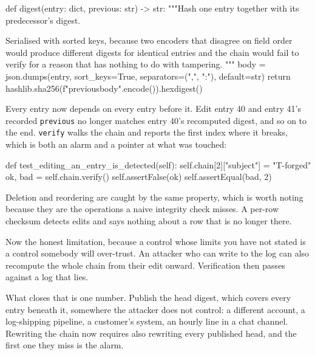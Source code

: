 \begin{py}
def digest(entry: dict, previous: str) -> str:
    """Hash one entry together with its predecessor's digest.

    Serialised with sorted keys, because two encoders that disagree on field
    order would produce different digests for identical entries and the chain
    would fail to verify for a reason that has nothing to do with tampering.
    """
    body = json.dumps(entry, sort_keys=True, separators=(",", ":"),
                      default=str)
    return hashlib.sha256(f"{previous}{body}".encode()).hexdigest()
\end{py}

Every entry now depends on every entry before it. Edit entry 40 and entry 41's
recorded \texttt{previous} no longer matches entry 40's recomputed digest, and
so on to the end. \texttt{verify} walks the chain and reports the first index
where it breaks, which is both an alarm and a pointer at what was touched:

\begin{py}
def test_editing_an_entry_is_detected(self):
    self.chain[2]["subject"] = "T-forged"
    ok, bad = self.chain.verify()
    self.assertFalse(ok)
    self.assertEqual(bad, 2)
\end{py}

Deletion and reordering are caught by the same property, which is worth noting
because they are the operations a naive integrity check misses. A per-row
checksum detects edits and says nothing about a row that is no longer there.

Now the honest limitation, because a control whose limits you have not stated is
a control somebody will over-trust. An attacker who can write to the log can
also recompute the whole chain from their edit onward. Verification then passes
against a log that lies.

What closes that is one number. Publish the head digest, which covers every
entry beneath it, somewhere the attacker does not control: a different account,
a log-shipping pipeline, a customer's system, an hourly line in a chat channel.
Rewriting the chain now requires also rewriting every published head, and the
first one they miss is the alarm.



